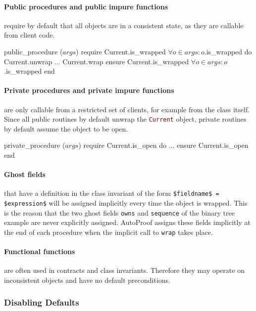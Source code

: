 \documentclass[a4paper,12pt]{article}
\newcommand{\AutoProof}{Auto\-Proof\xspace}
\newcommand{\e}[1]{\mbox{\lstinline[language=Eiffel]|#1|}}
\begin{document}
\paragraph{Public procedures and public impure functions} require by default that all objects are in a consistent state, as they are callable from client code.
\begin{erunning}
public_procedure ($args$)
	require
		Current.is_wrapped
		$\forall o\in args : o$.is_wrapped
	do
		Current.unwrap
		...
		Current.wrap
	ensure
		Current.is_wrapped
		$\forall o\in args : o$.is_wrapped
	end
\end{erunning}

\paragraph{Private procedures and private impure functions} are only callable from a restricted set of clients, for example from the class itself. Since all public routines by default unwrap the \e{Current} object, private routines by default assume the object to be open.
\begin{erunning}
private_procedure ($args$)
	require
		Current.is_open
	do ...
	ensure
		Current.is_open
	end
\end{erunning}

\paragraph{Ghost fields} that have a definition in the class invariant of the form \e{$fieldname$ = $expression$} will be assigned implicitly every time the object is wrapped. This is the reason that the two ghost fields \e{owns} and \e{sequence} of the binary tree example are never explicitly assigned. \AutoProof assigns these fields implicitly at the end of each procedure when the implicit call to \e{wrap} takes place.

\paragraph{Functional functions} are often used in contracts and class invariants. Therefore they may operate on inconsistent objects and have no default preconditions.

\subsubsection*{Disabling Defaults}
\end{document}
